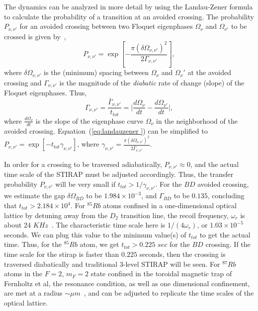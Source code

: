 \documentclass{article}
\begin{document}
The dynamics can be analyzed in more detail by using the Landau-Zener formula to calculate the probability of a transition at an avoided crossing. The probability $P_{\nu,\nu'}$ for an avoided crossing between two Floquet eigenphases $\Omega_{\nu}$ and $\Omega_{\nu'}$ to be crossed  is given by~\cite{zener:lzformula},~\cite{wittig:lzformula}
\begin{equation}
P_{\nu,\nu'}=\exp\left[-\frac{\pi ({\delta \Omega_{\nu,\nu'}})^2}{2\Gamma_{\nu,\nu'}}\right],
\label{eq:landauzener }
\end{equation}
%
where $\delta\Omega_{\nu,\nu'}$ is the (minimum) spacing  between $\Omega_\nu$ and $\Omega_\nu'$ at the avoided crossing and $\Gamma_{\nu,\nu'}$   is the magnitude of the \textit{diabatic} rate of change (slope) of the Floquet eigenphases. Thus,
%
\begin{equation}
\Gamma_{\nu,\nu'}=\frac{\bar {\Gamma}_{\nu,\nu'}}{t_{tot}} = {\biggl|} \frac{d\Omega_{\nu}}{dt} - \frac{d\Omega_{\nu'}}{dt}{\biggr|},
\label{eq:gamma }
\end{equation}
%
where  $\frac{d\Omega_\nu}{dt}$ is the slope of the  eigenphase curve $\Omega_\nu$ in the neighborhood of the avoided crossing. Equation~(\ref{eq:landauzener }) can be simplified to
$P_{\nu,\nu'}=\exp\left[-t_{tot}{\gamma}_{\nu,\nu'} \right]$, where ${\gamma}_{\nu,\nu'}=\frac{\pi ({\delta \Omega_{\nu,\nu'}})^2}{2{\bar \Gamma}_{\nu,\nu'}}$. 

In order for a crossing to be traversed adiabatically, $P_{\nu,\nu'}\approx 0$, and the actual time scale of the STIRAP must be adjusted accordingly. Thus, the transfer probability $P_{\nu,\nu'}$ will be very small if $t_{tot}>1/{\gamma}_{\nu,\nu'}$. 
 For the $BD$ avoided crossing, we estimate the gap $\delta \Omega_{BD}$ to be $1.984 \times 10^{-3}$, and  $\Gamma_{BD}$ to be $ 0.135$, concluding that $t_{tot}>2.184 \times 10^4$. For $^{85}Rb$ atoms confined in a one-dimensional optical lattice by detuning away from the $D_2$ transition line, the recoil frequency, $ \omega_r$ is about $24$ $KHz$~\cite{steck}. The characteristic time scale here is $1/(4\omega_r)$, or $1.03 \times 10^{-5}$ seconds. We can plug this value to the minimum value(s) of $t_{tot}$ to get the actual time. Thus, for the $^{85}Rb$ atom, we get $t_{tot}>0.225$ $sec$ for the $BD$ crossing. If the time scale for the stirap is faster than $0.225$ seconds, then the crossing is traversed diabatically and traditional 3-level STIRAP will be seen. For $^{87}Rb$ atoms in the $F=2$, $m_F=2$ state confined in the toroidal magnetic trap of Fernholtz et al, the resonance condition, as well as one dimensional confinement, are met at a radius $\sim \mu m$~\cite{fernholtz}, and can be adjusted to replicate the time scales of the optical lattice.
\end{document}

